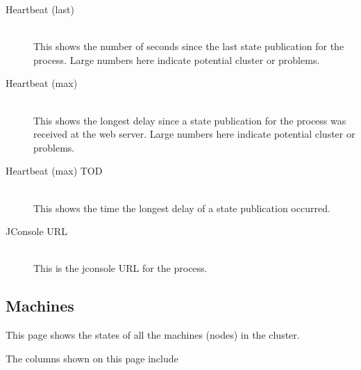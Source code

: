\begin{description}
      \item[Heartbeat (last)] \hfill \\ 
        This shows the number of seconds since the last state publication for the process. 
         Large numbers here indicate potential cluster or {\DUCC} problems.

      \item[Heartbeat (max)] \hfill \\ 
        This shows the longest delay since a state publication for the process was received
        at the web server.  Large numbers here indicate potential cluster or {\DUCC} problems.

      \item[Heartbeat (max) TOD] \hfill \\ 
        This shows the time the longest delay of a state publication occurred.

      \item[JConsole URL] \hfill \\ 
        This is the jconsole URL for the process.

   \end{description}
      
\subsection{Machines}

This page shows the states of all the machines (nodes) in the {\DUCC} cluster.

The columns shown on this page include

